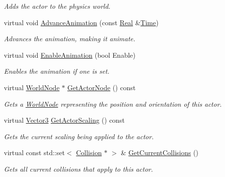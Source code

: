 \begin{DoxyCompactItemize}
\begin{DoxyCompactList}\small\item\em Adds the actor to the physics world. \item\end{DoxyCompactList}\item 
virtual void \hyperlink{classMezzanine_1_1ActorBase_ab245d50e649ec7335bbfcba86d9dc889}{AdvanceAnimation} (const \hyperlink{namespaceMezzanine_a726731b1a7df72bf3583e4a97282c6f6}{Real} \&\hyperlink{structMezzanine_1_1Time}{Time})
\begin{DoxyCompactList}\small\item\em Advances the animation, making it animate. \item\end{DoxyCompactList}\item 
virtual void \hyperlink{classMezzanine_1_1ActorBase_a28c9397e90ec680faf61845525312864}{EnableAnimation} (bool Enable)
\begin{DoxyCompactList}\small\item\em Enables the animation if one is set. \item\end{DoxyCompactList}\item 
virtual \hyperlink{classMezzanine_1_1WorldNode}{WorldNode} $\ast$ \hyperlink{classMezzanine_1_1ActorBase_a79803eb3d00e1e3722104fce473be085}{GetActorNode} () const 
\begin{DoxyCompactList}\small\item\em Gets a \hyperlink{classMezzanine_1_1WorldNode}{WorldNode} representing the position and orientation of this actor. \item\end{DoxyCompactList}\item 
virtual \hyperlink{classMezzanine_1_1Vector3}{Vector3} \hyperlink{classMezzanine_1_1ActorBase_a9255b5af0827d02505b7662486d8dd17}{GetActorScaling} () const 
\begin{DoxyCompactList}\small\item\em Gets the current scaling being applied to the actor. \item\end{DoxyCompactList}\item 
virtual const std::set$<$ \hyperlink{classMezzanine_1_1Collision}{Collision} $\ast$ $>$ \& \hyperlink{classMezzanine_1_1ActorBase_acb4f52d4033918be75ecc09485547bc4}{GetCurrentCollisions} ()
\begin{DoxyCompactList}\small\item\em Gets all current collisions that apply to this actor. \item\end{DoxyCompactList}\item 

\end{DoxyCompactItemize}
